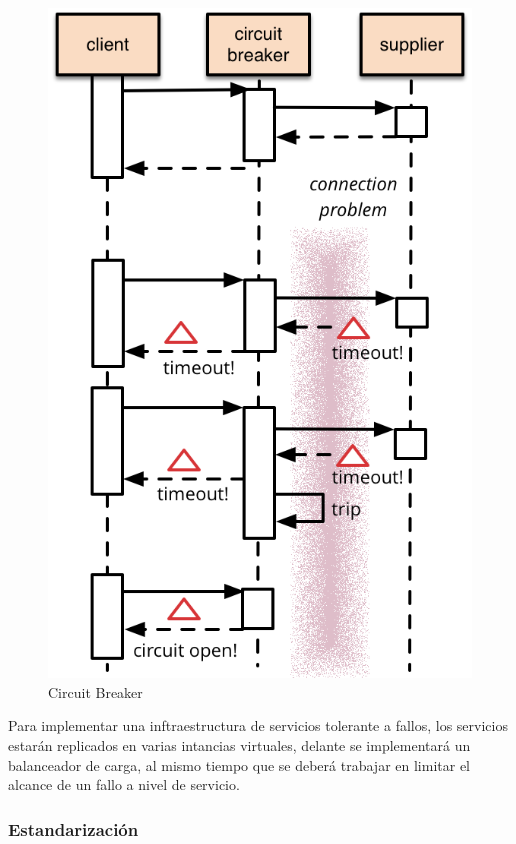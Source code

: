 \begin{figure}
  \includegraphics[width=\linewidth]{src/images/03-capitulo-3/circuit_breaker.png}
  \caption{Circuit Breaker}
  \label{fig:circuit_breaker}
\end{figure}

Para implementar una inftraestructura de servicios tolerante a fallos, los servicios estarán replicados en varias intancias virtuales, delante se implementará un balanceador de carga, al mismo tiempo que se deberá trabajar en limitar el alcance de un fallo a nivel de servicio.


\subsubsection{Estandarización}

